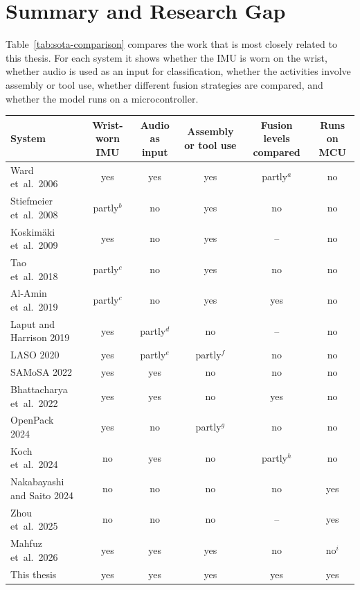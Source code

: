 \section{Summary and Research Gap}
\label{sec:sota-gap}

Table~\ref{tab:sota-comparison} compares the work that is most closely related
to this thesis. For each system it shows whether the IMU is worn on the wrist,
whether audio is used as an input for classification, whether the activities
involve assembly or tool use, whether different fusion strategies are compared,
and whether the model runs on a microcontroller.

\begin{table}[!ht]
\centering
\small
\renewcommand{\arraystretch}{1.2}
\begin{tabularx}{\textwidth}{|>{\raggedright\arraybackslash}p{4.1cm}|C|C|C|C|C|}
\hline
\textbf{System} & \textbf{Wrist-worn IMU} & \textbf{Audio as input}
  & \textbf{Assembly or tool use} & \textbf{Fusion levels compared}
  & \textbf{Runs on MCU} \\
\hline
Ward et~al.~2006~\cite{ward2006activity}            & yes    & yes    & yes    & partly$^{a}$ & no \\
Stiefmeier et~al.~2008~\cite{stiefmeier2008wearable} & partly$^{b}$ & no & yes  & no     & no \\
Koskim\"aki et~al.~2009~\cite{koskimaki2009activity} & yes    & no     & yes    & --     & no \\
Tao et~al.~2018~\cite{tao2018worker}                & partly$^{c}$ & no & yes  & no     & no \\
Al-Amin et~al.~2019~\cite{alamin2019action}         & partly$^{c}$ & no & yes  & yes    & no \\
Laput and Harrison 2019~\cite{laput2019sensing}     & yes    & partly$^{d}$ & no & --   & no \\
LASO 2020~\cite{chatterjee2020laso}                 & yes    & partly$^{e}$ & partly$^{f}$ & no & no \\
SAMoSA 2022~\cite{mollyn2022samosa}                 & yes    & yes    & no     & no     & no \\
Bhattacharya et~al.~2022~\cite{bhattacharya2022leveraging} & yes & yes & no    & yes    & no \\
OpenPack 2024~\cite{yoshimura2024openpack}          & yes    & no     & partly$^{g}$ & no & no \\
Koch et~al.~2024~\cite{koch2024recognition}         & no     & yes    & no     & partly$^{h}$ & no \\
Nakabayashi and Saito 2024~\cite{nakabayashi2024multimodal} & no & no  & no     & no     & yes \\
Zhou et~al.~2025~\cite{zhou2025efficient}           & no     & no     & no     & --     & yes \\
Mahfuz et~al.~2026~\cite{mahfuz2026proactive}       & yes    & yes    & yes    & no     & no$^{i}$ \\
\hline
This thesis                                         & yes    & yes    & yes    & yes    & yes \\
\hline
\end{tabularx}


\end{table}
